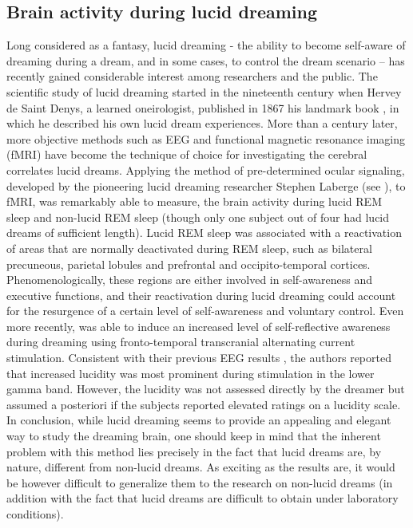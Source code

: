 \subsection{Brain activity during lucid dreaming}
\label{sec:dream-research:attempts:ba-lucid}

Long considered as a fantasy, lucid dreaming - the ability to become self-aware of dreaming during a dream, and in some cases, to control the dream scenario – has recently gained considerable interest among researchers and the public. The scientific study of lucid dreaming started in the nineteenth century when Hervey de Saint Denys, a learned oneirologist, published in 1867 his landmark book , in which he described his own lucid dream experiences. More than a century later, more objective methods such as EEG and functional magnetic resonance imaging (fMRI) have become the technique of choice for investigating the cerebral correlates lucid dreams. Applying the method of pre-determined ocular signaling, developed by the pioneering lucid dreaming researcher Stephen Laberge (see \citealp{laberge_exploring_1991}), to fMRI, \citet{dresler_neural_2012} was remarkably able to measure, the brain activity during lucid REM sleep and non-lucid REM sleep (though only one subject out of four had lucid dreams of sufficient length). Lucid REM sleep was associated with a reactivation of areas that are normally deactivated during REM sleep, such as bilateral precuneous, parietal lobules and prefrontal and occipito-temporal cortices. Phenomenologically, these regions are either involved in self-awareness and executive functions, and their reactivation during lucid dreaming could account for the resurgence of a certain level of self-awareness and voluntary control. Even more recently, \citet{voss_induction_2014} was able to induce an increased level of self-reflective awareness during dreaming using fronto-temporal transcranial alternating current stimulation. Consistent with their previous EEG results \citep{voss_lucid_2009}, the authors reported that increased lucidity was most prominent during stimulation in the lower gamma band. However, the lucidity was not assessed directly by the dreamer but assumed a posteriori if the subjects reported elevated ratings on a lucidity scale. In conclusion, while lucid dreaming seems to provide an appealing and elegant way to study the dreaming brain, one should keep in mind that the inherent problem with this method lies precisely in the fact that lucid dreams are, by nature, different from non-lucid dreams. As exciting as the results are, it would be however difficult to generalize them to the research on non-lucid dreams (in addition with the fact that lucid dreams are difficult to obtain under laboratory conditions).

